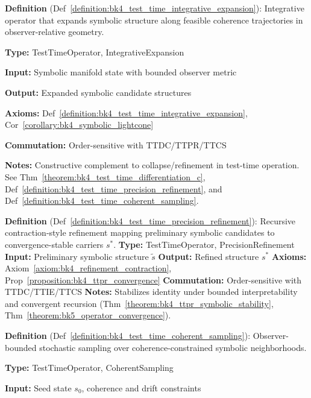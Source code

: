 \begin{description}[leftmargin=2.5cm, style=nextline]
\textbf{Definition} (Def~\ref{definition:bk4_test_time_integrative_expansion}): Integrative operator that expands symbolic structure along feasible coherence trajectories in observer-relative geometry.

\textbf{Type:} TestTimeOperator, IntegrativeExpansion

\textbf{Input:} Symbolic manifold state with bounded observer metric

\textbf{Output:} Expanded symbolic candidate structures

\textbf{Axioms:} Def~\ref{definition:bk4_test_time_integrative_expansion}, Cor~\ref{corollary:bk4_symbolic_lightcone}

\textbf{Commutation:} Order-sensitive with TTDC/TTPR/TTCS

\textbf{Notes:} Constructive complement to collapse/refinement in test-time
operation. See Thm~\ref{theorem:bk4_test_time_differentiation_c},
Def~\ref{definition:bk4_test_time_precision_refinement}, and
Def~\ref{definition:bk4_test_time_coherent_sampling}.

\item[\textbf{Test-Time Precision Refinement} \hfill \ensuremath{\mathrm{TTPR}}] 
\label{dict:appA_test_time_precision_refinement}
\textbf{Definition} (Def~\ref{definition:bk4_test_time_precision_refinement}): Recursive contraction-style refinement mapping preliminary symbolic candidates to convergence-stable carriers \( s^* \).
\textbf{Type:} TestTimeOperator, PrecisionRefinement
\textbf{Input:} Preliminary symbolic structure \( \tilde{s} \)
\textbf{Output:} Refined structure \( s^* \)
\textbf{Axioms:} Axiom~\ref{axiom:bk4_refinement_contraction}, Prop~\ref{proposition:bk4_ttpr_convergence}
\textbf{Commutation:} Order-sensitive with TTDC/TTIE/TTCS
\textbf{Notes:} Stabilizes identity under bounded interpretability and convergent recursion (Thm~\ref{theorem:bk4_ttpr_symbolic_stability}, Thm~\ref{theorem:bk5_operator_convergence}).

\item[\textbf{Test-Time Coherent Sampling} \hfill \ensuremath{\mathrm{TTCS}}] 
\label{dict:appA_test_time_coherent_sampling}
\textbf{Definition} (Def~\ref{definition:bk4_test_time_coherent_sampling}):
Observer-bounded stochastic sampling over coherence-constrained symbolic
neighborhoods.

\textbf{Type:} TestTimeOperator, CoherentSampling

\textbf{Input:} Seed state \( s_0 \), coherence and drift constraints


\end{description}
